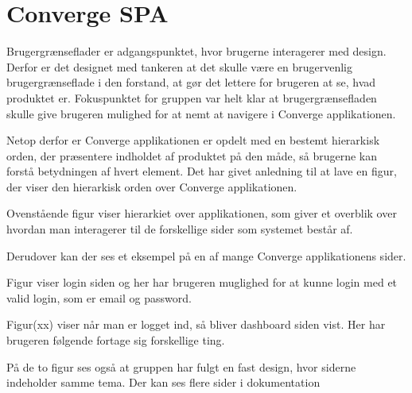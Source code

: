 \section{Converge SPA}
Brugergrænseflader er adgangspunktet, hvor brugerne interagerer med design. Derfor er det designet med tankeren at det skulle være en brugervenlig brugergrænseflade i den forstand, at gør det lettere for brugeren at se, hvad produktet er. Fokuspunktet for gruppen var helt klar at brugergrænsefladen skulle give brugeren mulighed for at nemt at navigere i Converge applikationen. 

Netop derfor er Converge applikationen er opdelt med en bestemt hierarkisk orden, der præsentere indholdet af produktet på den måde, så brugerne kan forstå betydningen af hvert element. Det har givet anledning til at lave en figur, der viser den hierarkisk orden over Converge applikationen.  


Ovenstående figur viser hierarkiet over applikationen, som giver et overblik over hvordan man interagerer til de forskellige sider som systemet består af.

Derudover kan der ses et eksempel på en af mange Converge applikationens sider.


Figur viser login siden og her har brugeren muglighed for at kunne login med et valid login, som er
email og password.


Figur(xx) viser når man er logget ind, så bliver dashboard siden vist. Her har
brugeren følgende fortage sig forskellige ting. 

På de to figur ses også at gruppen har fulgt en fast design, hvor siderne indeholder samme tema. Der kan ses flere sider i dokumentation  